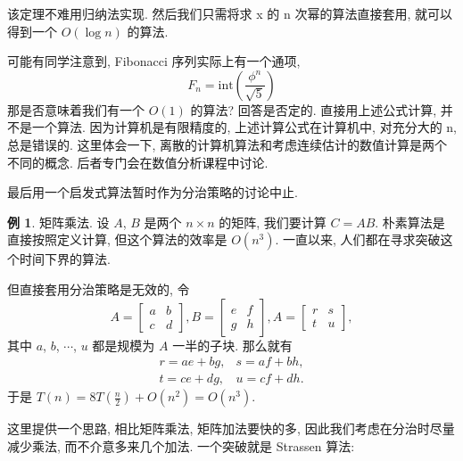 \documentclass[a4paper]{ctexart}
\theoremstyle{definition}
\theoremstyle{definition}
\newtheorem{example}{例}[section]
\begin{document}
该定理不难用归纳法实现. 然后我们只需将求 x 的 n 次幂的算法直接套用, 就可以得到一个 $O(\log n)$ 的算法. 

可能有同学注意到, Fibonacci 序列实际上有一个通项, 
\begin{equation}
  F_n = \mathrm{int} \left( \frac{\phi^n}{\sqrt{5}} \right)
\end{equation}
那是否意味着我们有一个 $O(1)$ 的算法? 回答是否定的. 直接用上述公式计算, 并不是一个算法. 因为计算机是有限精度的, 上述计算公式在计算机中, 
对充分大的 n, 总是错误的. 这里体会一下, 离散的计算机算法和考虑连续估计的数值计算是两个不同的概念. 后者专门会在数值分析课程中讨论. 

最后用一个启发式算法暂时作为分治策略的讨论中止. 

\begin{example}
  矩阵乘法. 设 $A$, $B$ 是两个 $n \times n$ 的矩阵, 我们要计算 $C = AB$.
  朴素算法是直接按照定义计算, 但这个算法的效率是 $O(n^3)$. 一直以来, 人们都在寻求突破这个时间下界的算法.
\end{example}

但直接套用分治策略是无效的, 令
\begin{equation}
  A = \left[
    \begin{array}{cc}
      a & b \\
      c & d
    \end{array}
  \right], 
  B = \left[
    \begin{array}{cc}
      e & f \\
      g & h
    \end{array}
  \right], 
  A = \left[
    \begin{array}{cc}
      r & s \\
      t & u 
    \end{array}
  \right], 
\end{equation}
其中 $a$, $b$, $\cdots$, $u$ 都是规模为 $A$ 一半的子块. 那么就有
\begin{equation}
  \begin{array}{ll}
    r = a e + b g, & s = a f + b h, \\
    t = c e + d g, & u = c f + d h.
  \end{array}
\end{equation}
于是 $T(n) = 8 T(\frac{n}{2}) + O(n^2) = O(n^3)$.

这里提供一个思路, 相比矩阵乘法, 矩阵加法要快的多, 因此我们考虑在分治时尽量减少乘法, 而不介意多来几个加法. 
一个突破就是 Strassen 算法: 
\end{document}
